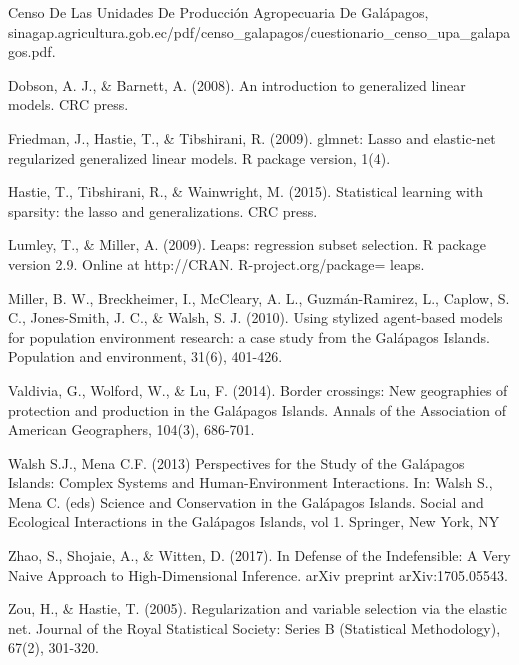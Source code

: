 \documentclass{article}
\begin{document}
\begin{thebibliography}{99}

 Censo De Las Unidades De Producci\'on Agropecuaria De Gal\'apagos, \\sinagap.agricultura.gob.ec/pdf/censo\_galapagos/cuestionario\_censo\_upa\_galapagos.pdf.

 Dobson, A. J., \& Barnett, A. (2008). An introduction to generalized linear models. CRC press.

 Friedman, J., Hastie, T., \& Tibshirani, R. (2009). glmnet: Lasso and elastic-net regularized generalized linear models. R package version, 1(4).

 Hastie, T., Tibshirani, R., \& Wainwright, M. (2015). Statistical learning with sparsity: the lasso and 
generalizations. CRC press.

 Lumley, T., \& Miller, A. (2009). Leaps: regression subset selection. R package version 2.9. Online at http://CRAN. R-project.org/package= leaps.

 Miller, B. W., Breckheimer, I., McCleary, A. L., Guzm\'an-Ramirez, L., Caplow, S. C., Jones-Smith, J. C., \& Walsh, S. J. (2010). Using stylized agent-based models for population environment research: a case study from the Gal\'apagos Islands. Population and environment, 31(6), 401-426.

Valdivia, G., Wolford, W., \& Lu, F. (2014). Border crossings: New geographies of protection and production in the Gal\'apagos Islands. Annals of the Association of American Geographers, 104(3), 686-701.

 Walsh S.J., Mena C.F. (2013) Perspectives for the Study of the Gal\'apagos Islands: Complex Systems and Human-Environment Interactions. In: Walsh S., Mena C. (eds) Science and Conservation in the Gal\'apagos Islands. Social and Ecological Interactions in the Gal\'apagos Islands, vol 1. Springer, New York, NY

 Zhao, S., Shojaie, A., \& Witten, D. (2017). In Defense of the Indefensible: A Very Naive Approach to High-Dimensional Inference. arXiv preprint arXiv:1705.05543.

 Zou, H., \& Hastie, T. (2005). Regularization and variable selection via the elastic net. Journal of the Royal Statistical Society: Series B (Statistical Methodology), 67(2), 301-320.




\end{thebibliography}
\end{document}

